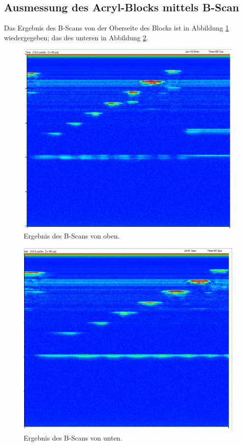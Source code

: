 \subsection{Ausmessung des Acryl-Blocks mittels B-Scan}

Das Ergebnis des B-Scans von der Oberseite des Blocks ist in Abbildung \ref{fig:boben} wiedergegeben; das
des unteren in Abbildung \ref{fig:bunten}. 

\begin{figure}
  \centering
  \includegraphics[scale=0.3]{content/bscan1.jpg}
  \caption{Ergebnis des B-Scans von oben.}
  \label{fig:boben}
\end{figure}

\begin{figure}
  \centering
  \includegraphics[scale=0.3]{content/bscan2.jpg}
  \caption{Ergebnis des B-Scans von unten.}
  \label{fig:bunten}
\end{figure}



